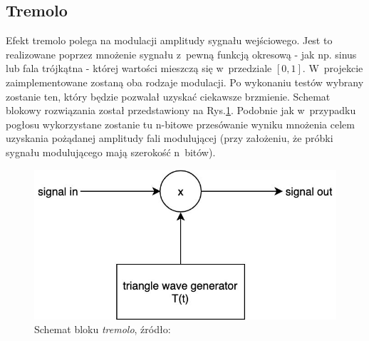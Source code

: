
\subsection{Tremolo}

Efekt tremolo polega na modulacji amplitudy sygnału wejściowego. Jest to realizowane poprzez mnożenie sygnału z~pewną funkcją okresową - jak np. sinus lub fala trójkątna - której wartości mieszczą się w~przedziale $[0,1]$. W~projekcie zaimplementowane zostaną oba rodzaje modulacji. Po wykonaniu testów wybrany zostanie ten, który będzie pozwalał uzyskać ciekawsze brzmienie. Schemat blokowy rozwiązania został przedstawiony na Rys.\ref{effects-tremolo}. Podobnie jak w~przypadku pogłosu wykorzystane zostanie tu n-bitowe przesówanie wyniku mnożenia celem uzyskania pożądanej amplitudy fali modulującej (przy założeniu, że próbki sygnału modulującego mają szerokość n~bitów).

\vspace{0.5cm}
\begin{figure}[ht]
    \centering
    \includegraphics[scale=0.4]{img/theoretical-analysis/tremolo.jpg}
    \captionsetup{format=plain,justification=centering}
    \caption{Schemat bloku \textit{tremolo}, źródło: \cite{fpga_pedal}}
    \label{effects-tremolo}
\end{figure}
\vspace{0.5cm}
